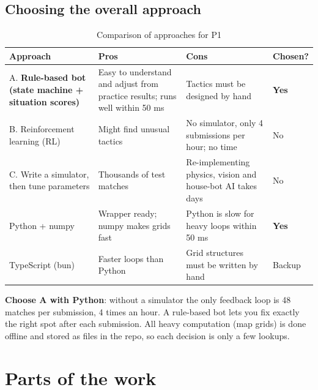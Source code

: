 \documentclass[a4paper,12pt]{article}
\newcommand{\fn}[1]{\texttt{\detokenize{#1}}}
\begin{document}
\subsection{Choosing the overall approach}
\begin{table}[H]
\centering\small
\begin{tabularx}{\textwidth}{L{3.3cm}YYC{1.7cm}}
\toprule
\textbf{Approach} & \textbf{Pros} & \textbf{Cons} & \textbf{Chosen?} \\
\midrule
A. \textbf{Rule-based bot (state machine + situation scores)} & Easy to understand and adjust from practice results; runs well within 50 ms & Tactics must be designed by hand & \textbf{Yes} \\
B. Reinforcement learning (RL) & Might find unusual tactics & No simulator, only 4 submissions per hour; no time & No \\
C. Write a simulator, then tune parameters & Thousands of test matches & Re-implementing physics, vision and house-bot AI takes days & No \\
\midrule
Python + numpy & Wrapper ready; numpy makes grids fast & Python is slow for heavy loops within 50 ms & \textbf{Yes} \\
TypeScript (bun) & Faster loops than Python & Grid structures must be written by hand & Backup \\
\bottomrule
\end{tabularx}
\caption{Comparison of approaches for P1}
\end{table}

\textbf{Choose A with Python}: without a simulator the only feedback loop is 48 matches per submission, 4 times an hour. A rule-based bot lets you fix exactly the right spot after each submission. All heavy computation (map grids) is done offline and stored as \fn{.npy} files in the repo, so each decision is only a few lookups.

\newpage
\section{Parts of the work}

\end{document}
